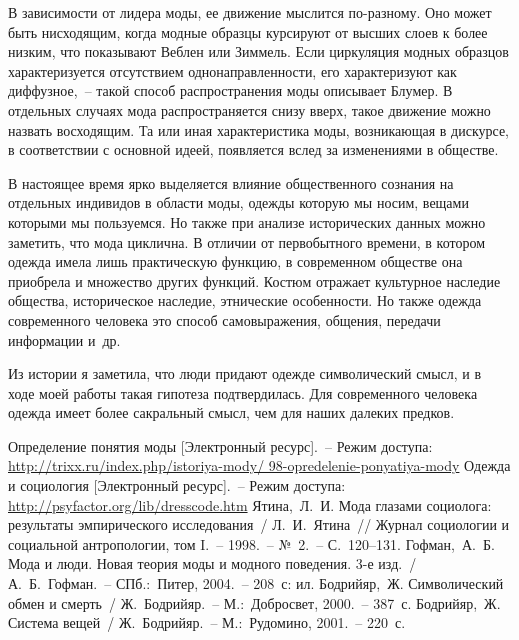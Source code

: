   В зависимости от лидера моды, ее движение мыслится по-разному. Оно может быть
  нисходящим, когда модные образцы курсируют от высших слоев к более низким, что
  показывают Веблен или Зиммель. Если циркуляция модных образцов характеризуется
  отсутствием однонаправленности, его характеризуют как диффузное,~-- такой
  способ распространения моды описывает Блумер. В отдельных случаях мода
  распространяется снизу вверх, такое движение можно назвать восходящим. Та или
  иная характеристика моды, возникающая в дискурсе, в соответствии с основной
  идеей, появляется вслед за изменениями в обществе.

  В настоящее время ярко выделяется влияние общественного сознания на отдельных
   индивидов в области моды, одежды которую мы носим, вещами которыми мы
  пользуемся. Но также при анализе исторических данных можно заметить, что мода
  циклична. В отличии от первобытного времени, в котором одежда имела лишь
  практическую функцию, в современном обществе она приобрела и множество других
  функций. Костюм отражает культурное наследие общества, историческое наследие,
  этнические особенности. Но также одежда современного человека это способ
  самовыражения, общения, передачи информации и~др.
  
  Из истории я заметила, что люди придают одежде символический смысл, и в ходе
  моей работы такая гипотеза подтвердилась. Для современного человека одежда
  имеет более сакральный смысл, чем для наших далеких предков.

  \newpage

  \renewcommand{\bibname}{Список литературы}
  \begin{thebibliography}{9}
     Определение понятия моды [Электронный ресурс].~--
      Режим доступа:\\
      \url{http://trixx.ru/index.php/istoriya-mody/
        98-opredelenie-ponyatiya-mody}
     Одежда и социология [Электронный ресурс].~--
      Режим доступа:\\
      \url{http://psyfactor.org/lib/dresscode.htm}
     Ятина,~Л.~И. Мода глазами социолога: результаты
      эмпирического исследования~/ Л.~И.~Ятина~// Журнал социологии и
      социальной антропологии, том I.~-- 1998.~-- №~2.~-- С.~120--131.
     Гофман,~А.~Б. Мода и люди. Новая теория моды и модного
      поведения. 3-е изд.~/ А.~Б.~Гофман.~-- СПб.:~Питер, 2004.~-- 208~с: ил.
     Бодрийяр,~Ж. Символический обмен и смерть~/
      Ж.~Бодрийяр.~-- М.:~Добросвет, 2000.~-- 387~с.
     Бодрийяр,~Ж. Система вещей~/
      Ж.~Бодрийяр.~-- М.:~Рудомино, 2001.~-- 220~с.
  \end{thebibliography}


